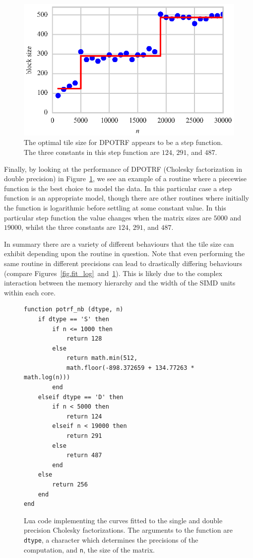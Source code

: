 \documentclass[a4paper,12pt]{article}
\begin{document}
\begin{figure}[ht]
  \centering
  \includegraphics[scale=1]{fig/curvefit_step.eps}
  \caption{The optimal tile size for DPOTRF appears to
    be a step function. The three constants in this step function
    are $124$, $291$, and $487$.}
  \label{fig.fit_step}
\end{figure}
Finally,
by looking at the performance of DPOTRF
(Cholesky factorization in double precision)
in Figure~\ref{fig.fit_step},
we see an example of a routine
where a piecewise function is
the best choice to model the data.
In this particular case a step function is
an appropriate model,
though there are other routines where
initially the function is logarithmic before
settling at some constant value.
In this particular step function the value changes
when the matrix sizes are $5000$ and $19000$,
whilst the three constants are $124$, $291$, and $487$.

In summary there are a variety of different behaviours that
the tile size can exhibit depending upon the
routine in question.
Note that even performing the same routine in different
precisions can lead to drastically differing behaviours
(compare Figures~\ref{fig.fit_log}~and~\ref{fig.fit_step}).
This is likely due to the complex interaction between the
memory hierarchy and the width of the SIMD units within each core.

\begin{figure}[ht]
  \centering
\begin{verbatim}
function potrf_nb (dtype, n)
    if dtype == 'S' then
        if n <= 1000 then
            return 128
        else
            return math.min(512,
            math.floor(-898.372659 + 134.77263 * math.log(n)))
        end
    elseif dtype == 'D' then
        if n < 5000 then
       	    return 124
        elseif n < 19000 then
            return 291
        else
            return 487
        end
    else
        return 256
    end
end
\end{verbatim}
  \caption{Lua code implementing the curves fitted to the single and
    double precision Cholesky factorizations. The arguments to the
    function are \texttt{dtype}, a character which determines the
    precisions of the computation, and \texttt{n}, the size of the matrix.}
  \label{fig.lua_code}
\end{figure}
\end{document}
